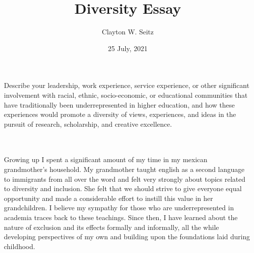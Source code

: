 \documentclass{article}
\title{Diversity Essay}
\author{Clayton W. Seitz}
\date{25 July, 2021}
\begin{document}
  \maketitle%
\vspace{0.4in}

Describe your leadership, work experience, service experience, or other significant involvement with racial, ethnic, socio-economic, or educational communities that have traditionally been underrepresented in higher education, and how these experiences would promote a diversity of views, experiences, and ideas in the pursuit of research, scholarship, and creative excellence.\\\\\

	Growing up I spent a significant amount of my time in my mexican grandmother’s household. My grandmother taught english as a second language to immigrants from all over the word and felt very strongly about topics related to diversity and inclusion. She felt that we should strive to give everyone equal opportunity and made a considerable effort to instill this value in her grandchildren. I believe my sympathy for those who are underrepresented in academia traces back to these teachings. Since then, I have learned about the nature of exclusion and its effects formally and informally, all the while developing perspectives of my own and building upon the foundations laid during childhood.
	
\end{document}
